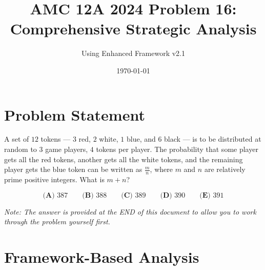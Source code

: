 \documentclass[12pt]{article}
\title{\textbf{AMC 12A 2024 Problem 16:\\Comprehensive Strategic Analysis}}
\author{Using Enhanced Framework v2.1}
\date{\today}
\begin{document}
\maketitle

\section*{Problem Statement}

A set of $12$ tokens — $3$ red, $2$ white, $1$ blue, and $6$ black — is to be distributed at random to $3$ game players, $4$ tokens per player. The probability that some player gets all the red tokens, another gets all the white tokens, and the remaining player gets the blue token can be written as $\frac{m}{n}$, where $m$ and $n$ are relatively prime positive integers. What is $m+n$?

$$\textbf{(A) } 387 \qquad \textbf{(B) } 388 \qquad \textbf{(C) } 389 \qquad \textbf{(D) } 390 \qquad \textbf{(E) } 391$$

\vspace{1em}
\noindent\textit{Note: The answer is provided at the END of this document to allow you to work through the problem yourself first.}

\section*{Framework-Based Analysis}
\end{document}

